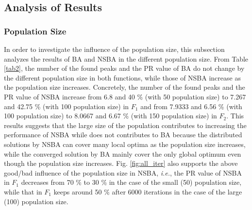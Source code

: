 \documentclass{ies2018}
\begin{document}
\subsection{Analysis of Results}
\subsubsection{Population Size}
In order to investigate the influence of the population size, this subsection analyzes the results of BA and NSBA in the different population size. From Table \ref{tab2}, the number of the found peaks and the PR value of BA do not change by the different population size in both functions, while those of NSBA increase as the population size increases. Concretely, the number of the found peaks and the PR value of NSBA increase from 6.8 and 40 \% (with 50 population size) to 7.267 and 42.75 \% (with 100 population size) in $F_1$ and from 7.9333 and 6.56 \% (with 100 population size) to 8.0667 and 6.67 \% (with 150 population size) in $F_2$. This results suggests that the large size of the population contributes to increasing the performance of NSBA while does not contributes to BA because the distributed solutions by NSBA can cover many local optima as the population size increases, while the converged solution by BA mainly cover the only global optimum even though the population size increases. Fig. \ref{fig:all_iter} also supports the above good/bad influence of the population size in NSBA, \textit{i.e.}, the PR value of NSBA in $F_1$ decreases from 70 \% to 30 \% in the case of the small (50) population size, while that in $F_1$ keeps around 50 \% after 6000 iterations in the case of the large (100) population size.
\end{document}
